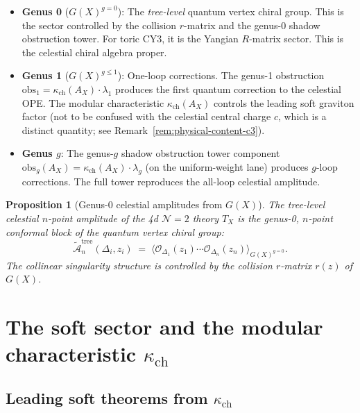 \documentclass[11pt]{article}
\newtheorem{proposition}[theorem]{Proposition}
\theoremstyle{definition}
\theoremstyle{remark}
\newcommand{\cA}{\mathcal{A}}
\newcommand{\cO}{\mathcal{O}}
\begin{document}
\begin{itemize}
\item \textbf{Genus 0} ($G(X)^{g=0}$): The \emph{tree-level}
 quantum vertex chiral group. This is the sector controlled by
 the collision $r$-matrix and the genus-0 shadow obstruction tower. For toric
 CY3, it is the Yangian $R$-matrix sector. This is the celestial
 chiral algebra proper.

\item \textbf{Genus 1} ($G(X)^{g \leq 1}$): One-loop corrections.
 The genus-1 obstruction $\mathrm{obs}_1 = \kappa_{\mathrm{ch}}(A_X) \cdot
 \lambda_1$ produces the first quantum correction to the celestial
 OPE. The modular characteristic $\kappa_{\mathrm{ch}}(A_X)$ controls the leading
 soft graviton factor (not to be confused with the celestial central
 charge $c$, which is a distinct quantity; see Remark~\ref{rem:physical-content-c3}).

\item \textbf{Genus $g$}: The genus-$g$ shadow obstruction tower component
 $\mathrm{obs}_g(A_X) = \kappa_{\mathrm{ch}}(A_X) \cdot \lambda_g$ (on the
 uniform-weight lane) produces $g$-loop corrections. The
 full tower reproduces the all-loop celestial amplitude.
\end{itemize}

\begin{proposition}[Genus-0 celestial amplitudes from $G(X)$]
\label{prop:genus-0-celestial}
The tree-level celestial $n$-point amplitude of the 4d
$\mathcal{N}=2$ theory $T_X$ is the genus-0, $n$-point conformal
block of the quantum vertex chiral group:
\[
\widetilde{\cA}_n^{\mathrm{tree}}(\Delta_i, z_i)
\;=\;
\langle \cO_{\Delta_1}(z_1) \cdots \cO_{\Delta_n}(z_n)
\rangle_{G(X)^{g=0}}.
\]
The collinear singularity structure is controlled by the
collision $r$-matrix $r(z)$ of $G(X)$.
\end{proposition}

\section{The soft sector and the modular characteristic $\kappa_{\mathrm{ch}}$}
\label{sec:soft-sector-kappa}

\subsection{Leading soft theorems from $\kappa_{\mathrm{ch}}$}
\end{document}

